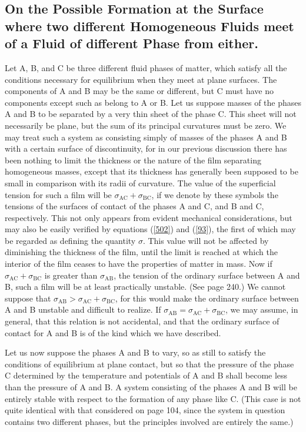 \documentclass[12pt]{article}
\begin{document}
{\subsection{On the Possible Formation at the Surface where two different Homogeneous Fluids meet of a Fluid of different Phase from either.}
Let A, B, and C be three different fluid phases of matter, which satisfy all the conditions necessary for equilibrium when they meet at plane surfaces. The components of A and B may be the same or different, but C must have no components except such as belong to A or B. Let us suppose masses of the phases A and B to be separated by a very thin sheet of the phase C. This sheet will not necessarily be plane, but the sum of its principal curvatures must be zero. We may treat such a system as consisting simply of masses of the phases A and B with a certain surface of discontinuity, for in our previous discussion there has been nothing to limit the thickness or the nature of the film separating homogeneous masses, except that its thickness has generally been supposed to be small in comparison with its radii of curvature.  The value of the superficial tension for such a film will be $\sigma_{\text{AC}} + \sigma_{\text{BC}}$, if we denote by these symbols the tensions of the surfaces of contact of the phases A and C, and B and C, respectively. This not only appears from evident mechanical considerations, but may also be easily verified by equations (\ref{502}) and (\ref{93}), the first of which may be regarded as defining the quantity $\sigma$. This value will not be affected by diminishing the thickness of the film, until the limit is reached at which the interior of the film ceases to have the properties of matter in mass. Now if $\sigma_{\text{AC}} + \sigma_{\text{BC}}$ is greater than $\sigma_{\text{AB}}$, the tension of the ordinary surface between A and B, such a film will be at least practically unstable.  (See page 240.)  We cannot suppose that $\sigma_{\text{AB}} > \sigma_{\text{AC}}+ \sigma_{\text{BC}}$, for this would make the ordinary surface between A and B unstable and difficult to realize. If $\sigma_{\text{AB}} = \sigma_{\text{AC}}+ \sigma_{\text{BC}}$, we may assume, in general, that this relation is not accidental, and that the ordinary surface of contact for A and B is of the kind which we have described.

Let us now suppose the phases A and B to vary, so as still to satisfy the conditions of equilibrium at plane contact, but so that the pressure of the phase C determined by the temperature and potentials of A and B shall become less than the pressure of A and B. A system consisting of the phases A and B will be entirely stable with respect to the formation of any phase like C. (This case is not quite identical with that considered on page 104, since the system in question contains two different phases, but the principles involved are entirely the same.)

}
\end{document}
